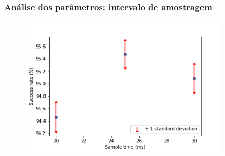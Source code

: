 \documentclass{beamer}
\begin{document}
\begin{frame}
    \frametitle{Análise dos parâmetros: intervalo de amostragem}

    \begin{figure}[]
        \centering
        \includegraphics[height=192pt]{Figure_2.png}
    \end{figure}

\end{frame}
\end{document}

